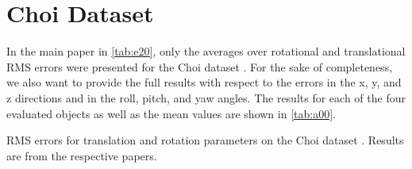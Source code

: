 \documentclass[10pt,twocolumn,letterpaper]{article}
\begin{document}
\section{Choi Dataset}\label{sec:a1}
In the main paper in \cref{tab:e20}, only the averages over rotational and translational \acs{RMS} errors were presented for the Choi dataset \cite{Choi2013}.
For the sake of completeness, we also want to provide the full results with respect to the errors in the x, y, and z directions and in the roll, pitch, and yaw angles.
The results for each of the four evaluated objects as well as the mean values are shown in \cref{tab:a00}.
\begin{table}
	\caption{
		\acs{RMS} errors for translation and rotation parameters on the Choi dataset \cite{Choi2013}.
		Results are from the respective papers.
	}\label{tab:a00}
	

\end{table}
\end{document}
